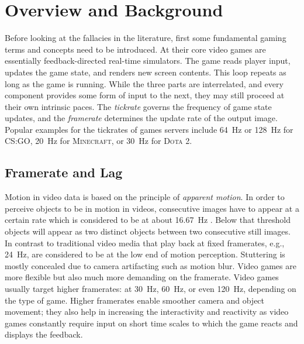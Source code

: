 \section{Overview and Background}
\label{sec:background}

Before looking at the fallacies in the literature, first some fundamental gaming terms and concepts need to be introduced. At their core video games are essentially feedback-directed real-time simulators. The game reads player input, updates the game state, and renders new screen contents. This loop repeats as long as the game is running. While the three parts are interrelated, and every component provides some form of input to the next, they may still proceed at their own intrinsic paces. The \textit{tickrate} governs the frequency of game state updates, and the \textit{framerate} determines the update rate of the output image. Popular examples for the tickrates of games servers include \SI{64}{\hertz} or \SI{128}{\hertz} for \textsc{CS:GO}, \SI{20}{\hertz} for \textsc{Minecraft}, or \SI{30}{\hertz} for \textsc{Dota 2}.


\subsection{Framerate and Lag}
\label{sec:framerate}

Motion in video data is based on the principle of \textit{apparent motion}. In order to perceive objects to be in motion in videos, consecutive images have to appear at a certain rate which is considered to be at about \SI{16.67}{\hertz} \cite{wertheimer1912experimentelle}. Below that threshold objects will appear as two distinct objects between two consecutive still images. In contrast to traditional video media that play back at fixed framerates, e.g., \SI{24}{\hertz}, are considered to be at the low end of motion perception. Stuttering is mostly concealed due to camera artifacting such as motion blur. Video games are more flexible but also much more demanding on the framerate. Video games usually target higher framerates: at \SI{30}{\hertz}, \SI{60}{\hertz}, or even \SI{120}{\hertz}, depending on the type of game. Higher framerates enable smoother camera and object movement; they also help in increasing the interactivity and reactivity as video games constantly require input on short time scales to which the game reacts and displays the feedback.


